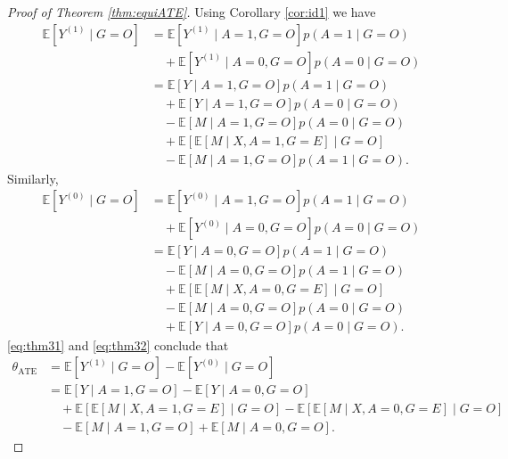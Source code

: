 \documentclass[10pt]{article}
\newcommand{\E}{\mathbb{E}}
\begin{document}
\begin{proof}[Proof of Theorem \ref{thm:equiATE}]
Using Corollary \ref{cor:id1} we have
\begin{equation}
\label{eq:thm31}
\begin{aligned}
\E[Y^{(1)}\mid G=O]
&=\E[Y^{(1)}\mid A=1, G=O]p(A=1\mid G=O)\\
&\quad +\E[Y^{(1)}\mid A=0, G=O]p(A=0\mid G=O)\\
&=\E[Y\mid A=1, G=O]p(A=1\mid G=O)\\
&\quad +\E[Y\mid A=1,G=O]p(A=0\mid G=O)\\
&\quad -\E[M\mid A=1,G=O]p(A=0\mid G=O)\\
&\quad +\E[\E[M\mid X,A=1,G=E]\mid G=O]\\
&\quad -\E[M\mid A=1,G=O]p(A=1\mid G=O).
\end{aligned}
\end{equation}
Similarly,
\begin{equation}
\label{eq:thm32}
\begin{aligned}
\E[Y^{(0)}\mid G=O]
&=\E[Y^{(0)}\mid A=1, G=O]p(A=1\mid G=O)\\
&\quad +\E[Y^{(0)}\mid A=0, G=O]p(A=0\mid G=O)\\
&=\E[Y\mid A=0,G=O]p(A=1\mid G=O)\\
&\quad -\E[M\mid A=0,G=O]p(A=1\mid G=O)\\
&\quad +\E[\E[M\mid X,A=0,G=E]\mid G=O]\\
&\quad -\E[M\mid A=0,G=O]p(A=0\mid G=O)\\
&\quad +\E[Y\mid A=0, G=O]p(A=0\mid G=O).
\end{aligned}
\end{equation}
\eqref{eq:thm31} and \eqref{eq:thm32} conclude that 
\begin{align*}
\theta_{\text{ATE}} &=\E[Y^{(1)}\mid G=O]-\E[Y^{(0)}\mid G=O]\\
&=
\E[Y\mid A=1,G=O]-\E[Y\mid A=0,G=O]\\
&\quad+\E[\E[M\mid X,A=1,G=E]\mid G=O]-\E[\E[M\mid X,A=0,G=E]\mid G=O]\\
&\quad-\E[M\mid A=1,G=O]+\E[M\mid A=0,G=O].
\end{align*}
\end{proof}
\end{document}
